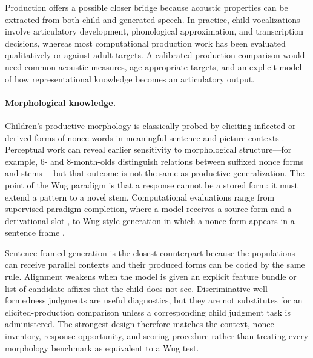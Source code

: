 Production offers a possible closer bridge because acoustic properties can be extracted from both child and generated speech. In practice, child vocalizations involve articulatory development, phonological approximation, and transcription decisions, whereas most computational production work has been evaluated qualitatively or against adult targets. A calibrated production comparison would need common acoustic measures, age-appropriate targets, and an explicit model of how representational knowledge becomes an articulatory output.

\paragraph{Morphological knowledge.}
Children's productive morphology is classically probed by eliciting inflected or derived forms of nonce words in meaningful sentence and picture contexts \citep{BerkoGleason1958,engelmann2019input,michaly2025development}. Perceptual work can reveal earlier sensitivity to morphological structure---for example, 6- and 8-month-olds distinguish relations between suffixed nonce forms and stems \citep{kim2021morphology}---but that outcome is not the same as productive generalization. The point of the Wug paradigm is that a response cannot be a stored form: it must extend a pattern to a novel stem. Computational evaluations range from supervised paradigm completion, where a model receives a source form and a derivational slot \citep{Cotterell2017}, to Wug-style generation in which a nonce form appears in a sentence frame \citep{weissweiler2023counting,anh2024morphology}.

Sentence-framed generation is the closest counterpart because the populations can receive parallel contexts and their produced forms can be coded by the same rule. Alignment weakens when the model is given an explicit feature bundle or list of candidate affixes that the child does not see. Discriminative well-formedness judgments are useful diagnostics, but they are not substitutes for an elicited-production comparison unless a corresponding child judgment task is administered. The strongest design therefore matches the context, nonce inventory, response opportunity, and scoring procedure rather than treating every morphology benchmark as equivalent to a Wug test.

